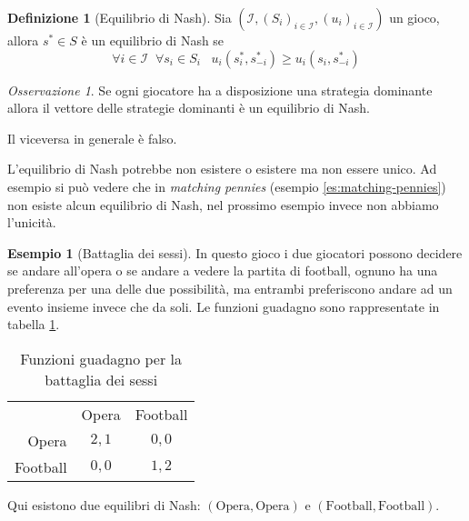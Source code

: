 \documentclass[a4paper]{article}
\theoremstyle{plain}
\theoremstyle{definition}
\newtheorem{mydef}[myteo]{Definizione}
\newtheorem{myes}[myteo]{Esempio}
\theoremstyle{remark}
\newtheorem{myoss}[myteo]{Osservazione}
\newcommand{\pa}[1]{\left(#1\right)}
\begin{document}
\begin{mydef}[Equilibrio di Nash]
  Sia  $\pa{\mathcal{I},\pa{S_i}_{i\in\mathcal{I}},
    \pa{u_i}_{i\in\mathcal{I}}}$ un gioco, allora  
  $s^* \in S$ è un equilibrio di Nash se
  \[ \forall i\in \mathcal{I}\;\; \forall s_i \in S_i \;\;\;
    u_i\pa{s^*_i,s^*_{-i}} \ge u_i\pa{s_i,s^*_{-i}} \]
\end{mydef}

\begin{myoss}
  Se ogni giocatore ha a disposizione una strategia dominante allora
  il vettore delle strategie dominanti è un equilibrio di Nash.
  
  Il viceversa in generale è falso.
\end{myoss}

L'equilibrio di Nash potrebbe non esistere o esistere ma non essere
unico. Ad esempio si può vedere che in \textit{matching pennies}
(esempio \ref{es:matching-pennies}) non esiste alcun equilibrio di
Nash, nel prossimo esempio invece non abbiamo l'unicità.

\begin{myes}[Battaglia dei sessi]
  In questo gioco i due giocatori possono decidere se andare all'opera
  o se andare a vedere la partita di football, ognuno ha una
  preferenza per una delle due possibilità, ma entrambi preferiscono
  andare ad un evento insieme invece che da soli. Le funzioni guadagno
  sono rappresentate in tabella \ref{tab:u1u2-sessi}.
  
  \begin{table}[!ht]
    \centering
    \begin{tabular}{rcc}
      & Opera & Football \\
      \cline{2-3}
      Opera & \multicolumn{1}{|c|}{$2,1$} & \multicolumn{1}{|c|}{$0,0$}  \\
      \cline{2-3}
      Football & \multicolumn{1}{|c|}{$0,0$} & \multicolumn{1}{|c|}{$1,2$}  \\
      \cline{2-3}
    \end{tabular}
    \caption{Funzioni guadagno per la battaglia dei sessi}
    \label{tab:u1u2-sessi}
  \end{table}
  
  Qui esistono due equilibri di Nash: $\pa{\text{Opera},\text{Opera}}$
  e $\pa{\text{Football},\text{Football}}$.
\end{myes}




\end{document}
